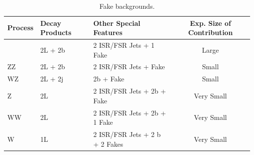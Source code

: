 	\begin{table}[hbt]
	\begin{center}
	\begin{tabular}{l|ll|c}\hline\hline %
	Process & Decay Products & Other Special Features & Exp. Size of Contribution\\
	\hline
	\ttbar & 2L + 2b & 2 ISR/FSR Jets + 1 Fake & Large\\
	ZZ & 2L + 2b & 2 ISR/FSR Jets + Fake & Small\\
	WZ & 2L + 2j & 2b + Fake & Small\\
	Z & 2L & 2 ISR/FSR Jets + 2b + Fake & Very Small\\
	WW & 2L & 2 ISR/FSR Jets + 2b + 1 Fake & Very Small\\
	W & 1L & 2 ISR/FSR Jets + 2 b + 2 Fakes & Very Small\\
	\hline \hline
	\end{tabular}
	\caption{\label{tab:fake_bkg} Fake backgrounds.}
	\end{center}
	\end{table}

			
			
			
			
			